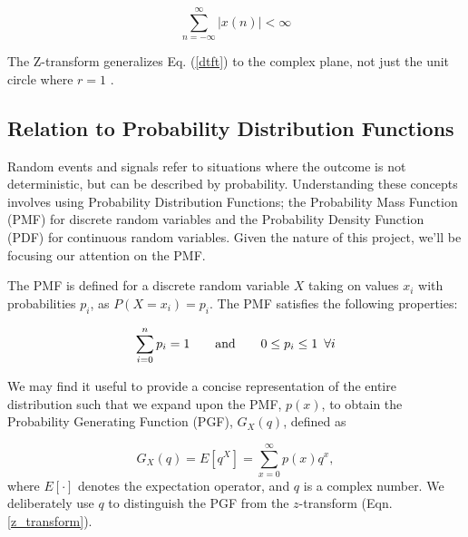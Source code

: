 \documentclass[a4paper]{report}
\begin{document}
\begin{equation}
\sum^{\infty}_{n = -\infty} |x(n)| < \infty
\end{equation}

The Z-transform generalizes Eq. (\ref{dtft}) to the complex plane, not just the unit circle where $r = 1$ \citep{Oppenheim1989DTSP}.

\subsection{Relation to Probability Distribution Functions}\label{pdfs}
Random events and signals refer to situations where the outcome is not deterministic, but can be described by probability. Understanding these concepts involves using Probability Distribution Functions; the Probability Mass Function (PMF) for discrete random variables and the Probability Density Function (PDF) for continuous random variables. Given the nature of this project, we'll be focusing our attention on the PMF.

The PMF is defined for a discrete random variable $X$ taking on values $x_i$ with probabilities $p_i$, as $P(X=x_i) = p_i$. The PMF satisfies the following properties:

\begin{equation}
    \sum_{i=0}^n p_i = 1 \hspace{2em}\text{and}\hspace{2em} 0 \leq p_i \leq 1 \hspace{0.5em}\forall i
\end{equation}

We may find it useful to provide a concise representation of the entire distribution such that we expand upon the PMF, $p(x)$, to obtain the Probability Generating Function (PGF), $G_X(q)$, defined as

\begin{equation}
	G_X(q) = E[q^X] = \sum^{\infty}_{x = 0} p(x)q^x,
\end{equation}
where $E[\cdot]$ denotes the expectation operator, and $q$ is a complex number. We deliberately use $q$ to distinguish the PGF from the $z$-transform (Eqn. \ref{z_transform}).
\end{document}
